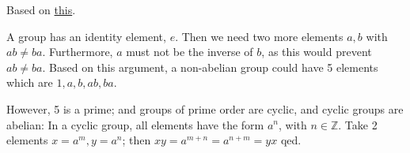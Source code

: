 
Based on
\href{http://math.stackexchange.com/questions/1971166/show-that-a-nonabelian-group-must-have-at-least-five-distinct-elements}{this}.

A group has an identity element, \(e\). Then we need two more elements
\(a, b\) with \(ab \neq ba\). Furthermore, \(a\) must not be the inverse
of \(b\), as this would prevent \(ab \neq ba\). Based on this argument,
a non-abelian group could have 5 elements which are \(1, a, b, ab, ba\).

However, 5 is a prime; and groups of prime order are cyclic, and cyclic
groups are abelian: In a cyclic group, all elements have the form
\(a^n\), with \(n \in \mathbb{Z}\). Take 2 elements
\(x = a^m, y = a^n\); then \(xy = a^{m+n} = a^{n+m} = yx\) qed.
